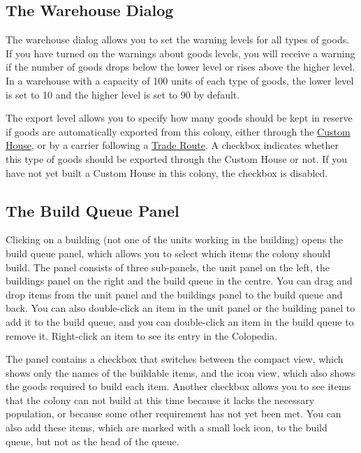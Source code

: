 \documentclass[12pt]{book}
\begin{document}
\hypertarget{The Warehouse Dialog}{\subsection{The Warehouse Dialog}}

The warehouse dialog allows you to set the warning levels for all
types of goods. If you have turned on the warnings about goods levels,
you will receive a warning if the number of goods drops below the
lower level or rises above the higher level. In a warehouse with a
capacity of 100 units of each type of goods, the lower level is set to
10 and the higher level is set to 90 by default.

The export level allows you to specify how many goods should be kept
in reserve if goods are automatically exported from this colony,
either through the \hyperlink{Custom House}{Custom House}, or by a
carrier following a \hyperlink{Trade Routes}{Trade Route}. A checkbox
indicates whether this type of goods should be exported through the
Custom House or not. If you have not yet built a Custom House in this
colony, the checkbox is disabled.


\hypertarget{The Build Queue Panel}{\subsection{The Build Queue Panel}}

Clicking on a building (not one of the units working in the building)
opens the build queue panel, which allows you to select which items
the colony should build. The panel consists of three sub-panels, the
unit panel on the left, the buildings panel on the right and the build
queue in the centre. You can drag and drop items from the unit panel
and the buildings panel to the build queue and back. You can also
double-click an item in the unit panel or the building panel to add it
to the build queue, and you can double-click an item in the build
queue to remove it. Right-click an item to see its entry in the
Colopedia.

The panel contains a checkbox that switches between the compact view,
which shows only the names of the buildable items, and the icon view,
which also shows the goods required to build each item. Another
checkbox allows you to see items that the colony can not build at this
time because it lacks the necessary population, or because some other
requirement has not yet been met. You can also add these items, which
are marked with a small lock icon, to the build queue, but not as the
head of the queue.
\end{document}
